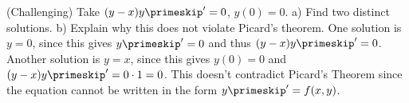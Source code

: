 {(Challenging) Take $(y-x)y\primeskip' = 0$, $y(0) = 0$.  a) Find two distinct solutions.  b)
Explain why this does not violate Picard's theorem. }
{One solution is $y=0$, since this gives $y\primeskip'=0$ and thus $(y-x)y\primeskip'=0$. Another solution is $y=x$, since this gives $y(0)=0$ and $(y-x)y\primeskip' = 0\cdot 1 = 0$. This doesn't contradict Picard's Theorem since the equation cannot be written in the form $y\primeskip'=f(x,y)$.}